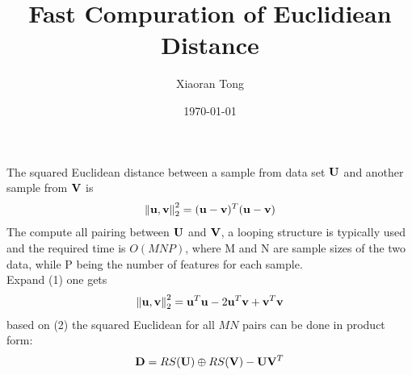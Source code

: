 \documentclass{beamer}
\title[Fast Euclidean]{Fast Compuration of Euclidiean Distance}
\author{Xiaoran Tong} %
\institute[EPI Biosta,
MSU] %
{ Michigan State University \\ %
  \medskip \textit{tongxia1@msu.edu} \\%
} \date{\today} %
\begin{document}
\begin{frame}
  \titlepage %
\end{frame}


\begin{frame}
  The squared Euclidean distance between a sample from data set $\mathbf{U}$ and another sample
  from $\mathbf{V}$ is
  \begin{align}
    \left\lVert\mathbf{u}, \mathbf{v}\right\rVert_2^2 = (\mathbf{u} - \mathbf{v})^T(\mathbf{u} - \mathbf{v})
  \end{align}
  The compute all pairing between $\mathbf{U}$ and $\mathbf{V}$, a looping structure
  is typically used and the required time is $O(MNP)$, where M and N
  are sample sizes of the two data, while P being the number of
  features for each sample. \\
  Expand (1) one gets
  \begin{align}
    \left\lVert\mathbf{u}, \mathbf{v}\right\rVert_2^2 = \mathbf{u}^T\mathbf{u} - 2\mathbf{u}^T\mathbf{v} + \mathbf{v}^T\mathbf{v}
  \end{align}
  based on (2) the squared Euclidean for all $MN$ pairs can be done in product form:
  \begin{align}
    \mathbf{D} = RS(\mathbf{U}) \oplus RS(\mathbf{V}) - \mathbf{U} \mathbf{V}^T
  \end{align}
\end{frame}
\end{document}
